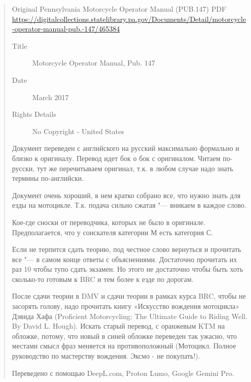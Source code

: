 \begin{abstract}		
\noindent
Original Pennsylvania Motorcycle Operator Manual (PUB.147) PDF
\url{https://digitalcollections.statelibrary.pa.gov/Documents/Detail/motorcycle-operator-manual-pub.-147/465384}
	
	\begin{description}
		\item[Title] Motorcycle Operator Manual, Pub. 147
		\item[Date] March 2017
		\item[Rights Details] No Copyright - United States
	\end{description}
	
	\begin{rus}

	Документ переведен с английского на русский максимально формально и близко к оригиналу. Перевод идет бок о бок с оригиналом. Читаем по-русски, тут же перечитываем оригинал, т.к. в любом случае надо знать термины по-английски.
	
	Документ очень хороший, в нем кратко собрано все, что нужно знать для езды на мотоцикле. Т.к. подача сильно сжатая "--- вникаем в каждое слово.
	
	
	Кое-где сноски от переводчика, которых не было в оригинале.
	Предполагается, что у соискателя категории М есть категория С.
	
	Если не терпится сдать теорию, под честное слово вернуться и прочитать все "--- в самом конце ответы с объяснениями. Достаточно прочитать их раз 10 чтобы тупо сдать экзамен. Но этого не достаточно чтобы быть хоть сколько-то готовым к BRC и тем более к езде по дорогам.
	
	После сдачи теории в DMV и сдачи теории в рамках курса BRC, чтобы не засорять голову, надо прочитать книгу «Искусство вождения мотоцикла» Дэвида Хафа (Proficient Motorcycling: The Ultimate Guide to Riding Well. By David L. Hough). Искать старый перевод, с оранжевым KTM на обложке, потому, что новый в синей обложке переведен так ужасно, что местами смысл фраз меняется на противоположный (Мотоцикл. Полное руководство по мастерству вождения. Эксмо - не покупать!).
	
	Переведено с помощью DeepL.com, Proton Lumo, Google Gemini Pro. 
	
	

\end{rus}
\end{abstract}
